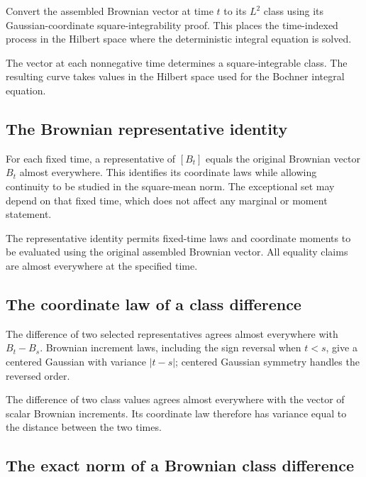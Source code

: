 \documentclass[11pt,a4paper]{report}
\begin{document}
Convert the assembled Brownian vector at time \(t\) to its \(L^2\) class using its Gaussian-coordinate square-integrability proof. This places the time-indexed process in the Hilbert space where the deterministic integral equation is solved.



The vector at each nonnegative time determines a square-integrable class. The resulting curve takes values in the Hilbert space used for the Bochner integral equation.

\subsection{\texorpdfstring{The Brownian representative identity}{The Brownian representative identity}}
\label{report-step-UnadjustedLangevin-GaussianCoordinates-lean-15}


For each fixed time, a representative of \([B_t]\) equals the original Brownian vector \(B_t\) almost everywhere. This identifies its coordinate laws while allowing continuity to be studied in the square-mean norm. The exceptional set may depend on that fixed time, which does not affect any marginal or moment statement.



The representative identity permits fixed-time laws and coordinate moments to be evaluated using the original assembled Brownian vector. All equality claims are almost everywhere at the specified time.

\subsection{\texorpdfstring{The coordinate law of a class difference}{The coordinate law of a class difference}}
\label{report-step-UnadjustedLangevin-GaussianCoordinates-lean-16}


The difference of two selected representatives agrees almost everywhere with \(B_t-B_s\). Brownian increment laws, including the sign reversal when \(t<s\), give a centered Gaussian with variance \(|t-s|\); centered Gaussian symmetry handles the reversed order.



The difference of two class values agrees almost everywhere with the vector of scalar Brownian increments. Its coordinate law therefore has variance equal to the distance between the two times.

\subsection{\texorpdfstring{The exact norm of a Brownian class difference}{The exact norm of a Brownian class difference}}
\label{report-step-UnadjustedLangevin-GaussianCoordinates-lean-17}
\end{document}
